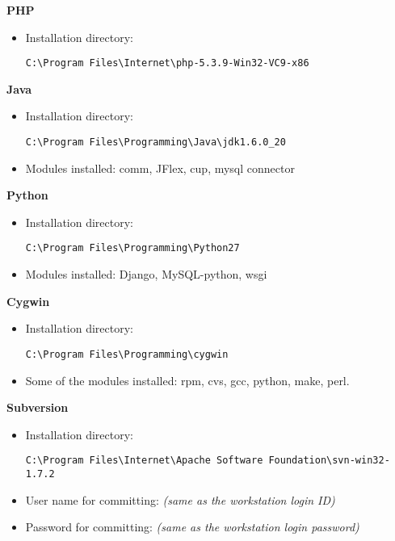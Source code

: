 \textbf{PHP}
\begin{itemize}
\item Installation directory: \begin{verbatim}C:\Program Files\Internet\php-5.3.9-Win32-VC9-x86\end{verbatim}
\end{itemize}
\textbf{Java}
\begin{itemize}
\item Installation directory: \begin{verbatim}C:\Program Files\Programming\Java\jdk1.6.0_20\end{verbatim}
\item Modules installed: comm, JFlex, cup, mysql connector
\end{itemize}
\textbf{Python}
\begin{itemize}
\item Installation directory: \begin{verbatim}C:\Program Files\Programming\Python27\end{verbatim}
\item Modules installed: Django, MySQL-python, wsgi
\end{itemize}
\textbf{Cygwin}
\begin{itemize}
\item Installation directory: \begin{verbatim}C:\Program Files\Programming\cygwin\end{verbatim}
\item Some of the modules installed: rpm, cvs, gcc, python, make, perl.
\end{itemize}
\textbf{Subversion}
\begin{itemize}
\item Installation directory: \begin{verbatim}C:\Program Files\Internet\Apache Software Foundation\svn-win32-1.7.2\end{verbatim}
\item User name for committing: \emph{(same as the workstation login ID)}
\item Password for committing: \emph{(same as the workstation login password)}
\end{itemize}